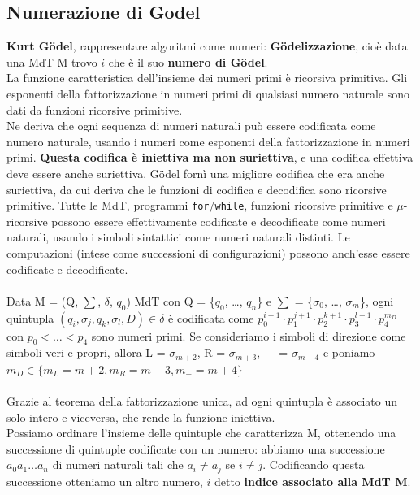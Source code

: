 \documentclass[10pt]{book}
\begin{document}
\subsection{Numerazione di Godel} 
\textbf{Kurt G\"{o}del}, rappresentare algoritmi come numeri: \textbf{G\"{o}delizzazione}, cioè data una MdT M trovo $i$ che è il suo \textbf{numero di G\"{o}del}.\\
La funzione caratteristica dell'insieme dei numeri primi è ricorsiva primitiva. Gli esponenti della fattorizzazione in numeri primi di qualsiasi numero naturale sono dati da funzioni ricorsive primitive.\\
Ne deriva che ogni sequenza di numeri naturali può essere codificata come numero naturale, usando i numeri come esponenti della fattorizzazione in numeri primi. \textbf{Questa codifica è iniettiva ma non suriettiva}, e una codifica effettiva deve essere anche suriettiva. G\"{o}del fornì una migliore codifica che era anche suriettiva, da cui deriva che le funzioni di codifica e decodifica sono ricorsive primitive. Tutte le MdT, programmi \texttt{for}/\texttt{while}, funzioni ricorsive primitive e $\mu$-ricorsive possono essere effettivamente codificate e decodificate come numeri naturali, usando i simboli sintattici come numeri naturali distinti. Le computazioni (intese come successioni di configurazioni) possono anch'esse essere codificate e decodificate.\\\\
Data M = (Q, $\sum$, $\delta$, $q_0$) MdT con Q = \{$q_0$, \ldots, $q_n$\} e $\sum$ = \{$\sigma_0$, \ldots, $\sigma_m$\}, ogni quintupla $(q_i, \sigma_j, q_k, \sigma_l, D)\in\delta$ è codificata come $p_0^{i+1}\cdot p_1^{j+1}\cdot p_2^{k+1}\cdot p_3^{l+1}\cdot p_4^{m_D}$ con $p_0<\ldots<p_4$ sono numeri primi. Se consideriamo i simboli di direzione come simboli veri e propri, allora L = $\sigma_{m+2}$, R = $\sigma_{m+3}$, --- = $\sigma_{m+4}$ e poniamo $m_D\in\{m_L=m+2, m_R=m+3, m_-=m+4\}$\\\\
Grazie al teorema della fattorizzazione unica, ad ogni quintupla è associato un solo intero e viceversa, che rende la funzione iniettiva.\\
Possiamo ordinare l'insieme delle quintuple che caratterizza M, ottenendo una successione di quintuple codificate con un numero: abbiamo una successione $a_0a_1\ldots a_n$ di numeri naturali tali che $a_i\neq a_j$ se $i\neq j$. Codificando questa successione otteniamo un altro numero, $i$ detto \textbf{indice associato alla MdT M}.\\\\
\end{document}

